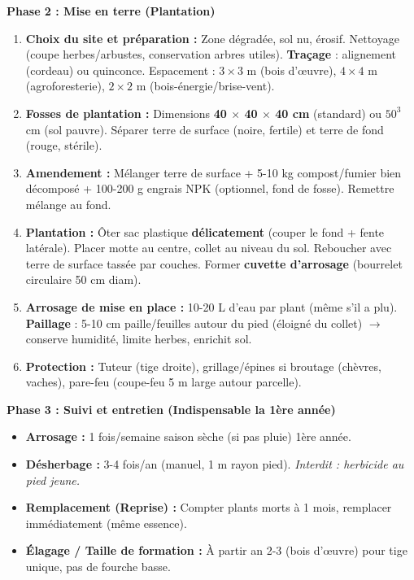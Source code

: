 \documentclass[11pt]{article}
\begin{document}
\begin{experience}
\textbf{Phase 2 : Mise en terre (Plantation)}
\begin{enumerate}
    \item \textbf{Choix du site et préparation :} Zone dégradée, sol nu, érosif. Nettoyage (coupe herbes/arbustes, conservation arbres utiles). \textbf{Traçage} : alignement (cordeau) ou quinconce. Espacement : $3 \times 3$ m (bois d'œuvre), $4 \times 4$ m (agroforesterie), $2 \times 2$ m (bois-énergie/brise-vent).
    \item \textbf{Fosses de plantation :} Dimensions \textbf{40 $\times$ 40 $\times$ 40 cm} (standard) ou $50^3$ cm (sol pauvre). Séparer terre de surface (noire, fertile) et terre de fond (rouge, stérile).
    \item \textbf{Amendement :} Mélanger terre de surface + 5-10 kg compost/fumier bien décomposé + 100-200 g engrais NPK (optionnel, fond de fosse). Remettre mélange au fond.
    \item \textbf{Plantation :} Ôter sac plastique \textbf{délicatement} (couper le fond + fente latérale). Placer motte au centre, collet au niveau du sol. Reboucher avec terre de surface tassée par couches. Former \textbf{cuvette d'arrosage} (bourrelet circulaire 50 cm diam).
    \item \textbf{Arrosage de mise en place :} 10-20 L d'eau par plant (même s'il a plu). \textbf{Paillage} : 5-10 cm paille/feuilles autour du pied (éloigné du collet) $\to$ conserve humidité, limite herbes, enrichit sol.
    \item \textbf{Protection :} Tuteur (tige droite), grillage/épines si broutage (chèvres, vaches), pare-feu (coupe-feu 5 m large autour parcelle).
\end{enumerate}

\textbf{Phase 3 : Suivi et entretien (Indispensable la 1ère année)}
\begin{itemize}
    \item \textbf{Arrosage :} 1 fois/semaine saison sèche (si pas pluie) 1ère année.
    \item \textbf{Désherbage :} 3-4 fois/an (manuel, 1 m rayon pied). \emph{Interdit : herbicide au pied jeune.}
    \item \textbf{Remplacement (Reprise) :} Compter plants morts à 1 mois, remplacer immédiatement (même essence).
    \item \textbf{Élagage / Taille de formation :} À partir an 2-3 (bois d'œuvre) pour tige unique, pas de fourche basse.
\end{itemize}


\end{experience}
\end{document}
